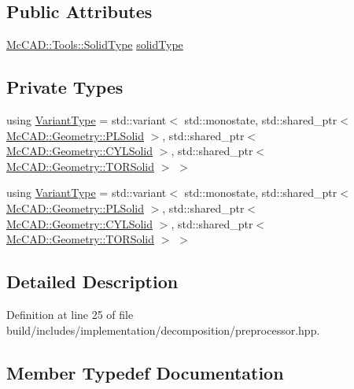 \subsection*{Public Attributes}
\begin{DoxyCompactItemize}
\item 
\hyperlink{classMcCAD_1_1Tools_1_1SolidType}{Mc\+C\+A\+D\+::\+Tools\+::\+Solid\+Type} \hyperlink{classMcCAD_1_1Decomposition_1_1Preprocessor_a556f8a0b05725f3c17f828fb4c23e9a9}{solid\+Type}
\end{DoxyCompactItemize}
\subsection*{Private Types}
\begin{DoxyCompactItemize}
\item 
using \hyperlink{classMcCAD_1_1Decomposition_1_1Preprocessor_a55fe8b69008632be9a000e551c3dfe90}{Variant\+Type} = std\+::variant$<$ std\+::monostate, std\+::shared\+\_\+ptr$<$ \hyperlink{classMcCAD_1_1Geometry_1_1PLSolid}{Mc\+C\+A\+D\+::\+Geometry\+::\+P\+L\+Solid} $>$, std\+::shared\+\_\+ptr$<$ \hyperlink{classMcCAD_1_1Geometry_1_1CYLSolid}{Mc\+C\+A\+D\+::\+Geometry\+::\+C\+Y\+L\+Solid} $>$, std\+::shared\+\_\+ptr$<$ \hyperlink{classMcCAD_1_1Geometry_1_1TORSolid}{Mc\+C\+A\+D\+::\+Geometry\+::\+T\+O\+R\+Solid} $>$ $>$
\item 
using \hyperlink{classMcCAD_1_1Decomposition_1_1Preprocessor_a55fe8b69008632be9a000e551c3dfe90}{Variant\+Type} = std\+::variant$<$ std\+::monostate, std\+::shared\+\_\+ptr$<$ \hyperlink{classMcCAD_1_1Geometry_1_1PLSolid}{Mc\+C\+A\+D\+::\+Geometry\+::\+P\+L\+Solid} $>$, std\+::shared\+\_\+ptr$<$ \hyperlink{classMcCAD_1_1Geometry_1_1CYLSolid}{Mc\+C\+A\+D\+::\+Geometry\+::\+C\+Y\+L\+Solid} $>$, std\+::shared\+\_\+ptr$<$ \hyperlink{classMcCAD_1_1Geometry_1_1TORSolid}{Mc\+C\+A\+D\+::\+Geometry\+::\+T\+O\+R\+Solid} $>$ $>$
\end{DoxyCompactItemize}


\subsection{Detailed Description}


Definition at line 25 of file build/includes/implementation/decomposition/preprocessor.\+hpp.



\subsection{Member Typedef Documentation}
\mbox{\label{classMcCAD_1_1Decomposition_1_1Preprocessor_a55fe8b69008632be9a000e551c3dfe90}} 
